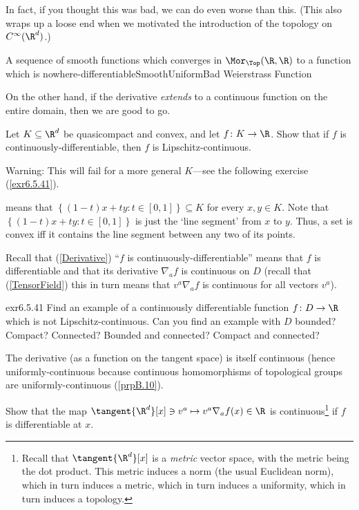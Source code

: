 In fact, if you thought this was bad, we can do even worse than this.  (This also wraps up a loose end when we motivated the introduction of the topology on $C^\infty (\R ^d)$.)
\begin{exm}{A sequence of smooth functions which converges in $\Mor _{\Top}(\R ,\R )$ to a function which is nowhere-differentiable}{SmoothUniformBad}
Weierstrass Function
\end{exm}
On the other hand, if the derivative \emph{extends} to a continuous function on the entire domain, then we are good to go.
\begin{exr}{}{}
Let $K\subseteq \R ^d$ be quasicompact and convex, and let $f\colon K\rightarrow \R$.  Show that if $f$ is continuously-differentiable, then $f$ is Lipschitz-continuous.
\begin{wrn}
Warning:  This will fail for a more general $K$---see the following exercise (\cref{exr6.5.41}).
\end{wrn}
\begin{rmk}
 means that $\left\{ (1-t)x+ty:t\in [0,1]\right\} \subseteq K$ for every $x,y\in K$.  Note that $\left\{ (1-t)x+ty:t\in [0,1]\right\}$ is just the `line segment' from $x$ to $y$.  Thus, a set is convex iff it contains the line segment between any two of its points.
\end{rmk}
\begin{rmk}
Recall that (\cref{Derivative}) ``$f$ is continuously-differentiable'' means that $f$ is differentiable and that its derivative $\nabla _af$ is continuous on $D$ (recall that (\cref{TensorField}) this in turn means that $v^a\nabla _af$ is continuous for all vectors $v^a$).
\end{rmk}
\end{exr}
\begin{exr}{}{exr6.5.41}
Find an example of a continuously differentiable function $f\colon D\rightarrow \R$ which is not Lipschitz-continuous.  Can you find an example with $D$ bounded?  Compact?  Connected?  Bounded and connected?  Compact and connected?
\end{exr}

The derivative (as a function on the tangent space) is itself continuous (hence uniformly-continuous because continuous homomorphisms of topological groups are uniformly-continuous (\cref{prpB.10}).
\begin{exr}{}{}
Show that the map $\tangent{\R ^d}[x]\ni v^a\mapsto v^a\nabla _af(x)\in \R$ is continuous\footnote{Recall that $\tangent{\R ^d}[x]$ is a \emph{metric} vector space, with the metric being the dot product.  This metric induces a norm (the usual Euclidean norm), which in turn induces a metric, which in turn induces a uniformity, which in turn induces a topology.} if $f$ is differentiable at $x$.
\end{exr}

